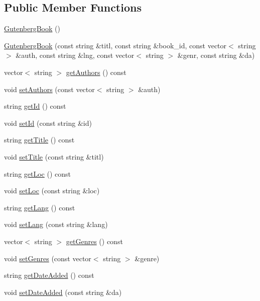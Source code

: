 \subsection*{Public Member Functions}
\begin{DoxyCompactItemize}
\item 
\hyperlink{classbridges_1_1dataset_1_1_gutenberg_book_ab88639acb3d28345f1db063d603f1123}{Gutenberg\+Book} ()
\item 
\hyperlink{classbridges_1_1dataset_1_1_gutenberg_book_a30d140ad9e22a049e866eb7c09ce8bfb}{Gutenberg\+Book} (const string \&titl, const string \&book\+\_\+id, const vector$<$ string $>$ \&auth, const string \&lng, const vector$<$ string $>$ \&genr, const string \&da)
\item 
vector$<$ string $>$ \hyperlink{classbridges_1_1dataset_1_1_gutenberg_book_ad10952350475c86f6046d64c3b8212f2}{get\+Authors} () const
\item 
void \hyperlink{classbridges_1_1dataset_1_1_gutenberg_book_a5c2d325adf794bb3c209c189ceea5987}{set\+Authors} (const vector$<$ string $>$ \&auth)
\item 
string \hyperlink{classbridges_1_1dataset_1_1_gutenberg_book_ab5ef4edc47d5db66352649c467d70f5b}{get\+Id} () const
\item 
void \hyperlink{classbridges_1_1dataset_1_1_gutenberg_book_a8878c16267f29b4a532f60a1d54564f4}{set\+Id} (const string \&id)
\item 
string \hyperlink{classbridges_1_1dataset_1_1_gutenberg_book_a40fe78ea917df1212d1918da4dcfeb7a}{get\+Title} () const
\item 
void \hyperlink{classbridges_1_1dataset_1_1_gutenberg_book_a2e42d04fa20f8cc0bfbe7213e68f7779}{set\+Title} (const string \&titl)
\item 
string \hyperlink{classbridges_1_1dataset_1_1_gutenberg_book_a1daccd8ce343c88ce4880b6008cefa52}{get\+Loc} () const
\item 
void \hyperlink{classbridges_1_1dataset_1_1_gutenberg_book_a6e729741b6fba636257edee0b2f4452d}{set\+Loc} (const string \&loc)
\item 
string \hyperlink{classbridges_1_1dataset_1_1_gutenberg_book_a0020145fdb11bd12c715a094917298a2}{get\+Lang} () const
\item 
void \hyperlink{classbridges_1_1dataset_1_1_gutenberg_book_a2dc5e0fd2629993fdf64ce98466eaa4d}{set\+Lang} (const string \&lang)
\item 
vector$<$ string $>$ \hyperlink{classbridges_1_1dataset_1_1_gutenberg_book_a3d9b810cf836d29f09ce9f36bb53604d}{get\+Genres} () const
\item 
void \hyperlink{classbridges_1_1dataset_1_1_gutenberg_book_a1c0160d5b2ecddcdfdb312469f887fe6}{set\+Genres} (const vector$<$ string $>$ \&genre)
\item 
string \hyperlink{classbridges_1_1dataset_1_1_gutenberg_book_aba5ec04a64025cfcd35ddb857ff50d6b}{get\+Date\+Added} () const
\item 
void \hyperlink{classbridges_1_1dataset_1_1_gutenberg_book_a4a6b0315cac474c384f63365d624a28c}{set\+Date\+Added} (const string \&da)
\end{DoxyCompactItemize}



